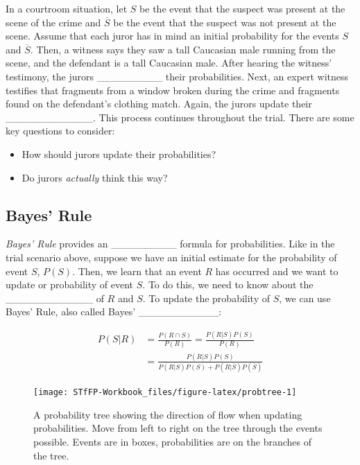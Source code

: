 \documentclass[]{book}
\providecommand{\tightlist}{%
  \setlength{\itemsep}{0pt}\setlength{\parskip}{0pt}}
\theoremstyle{definition}
\theoremstyle{definition}
\theoremstyle{remark}
\begin{document}
In a courtroom situation, let \(S\) be the event that the suspect was
present at the scene of the crime and \(\overline{S}\) be the event that
the suspect was not present at the scene. Assume that each juror has in
mind an initial probability for the events \(S\) and \(\overline{S}\).
Then, a witness says they saw a tall Caucasian male running from the
scene, and the defendant is a tall Caucasian male. After hearing the
witness' testimony, the jurors \_\_\_\_\_\_\_\_\_ their probabilities.
Next, an expert witness testifies that fragments from a window broken
during the crime and fragments found on the defendant's clothing match.
Again, the jurors update their \_\_\_\_\_\_\_\_\_\_\_\_. This process
continues throughout the trial. There are some key questions to
consider:

\begin{itemize}
\tightlist
\item
  How should jurors update their probabilities?
\item
  Do jurors \emph{actually} think this way?
\end{itemize}

\subsection{Bayes' Rule}\label{bayes-rule}

\emph{Bayes' Rule} provides an \_\_\_\_\_\_\_\_\_ formula for
probabilities. Like in the trial scenario above, suppose we have an
initial estimate for the probability of event \(S\), \(P(S)\). Then, we
learn that an event \(R\) has occurred and we want to update or
probability of event \(S\). To do this, we need to know about the
\_\_\_\_\_\_\_\_\_\_\_\_ of \(R\) and \(S\). To update the probability
of \(S\), we can use Bayes' Rule, also called Bayes'
\_\_\_\_\_\_\_\_\_\_\_:

\begin{equation}\label{eq:4}
\begin{split}
P(S|R) & = \frac{P(R \cap S)}{P(R)} = \frac{P(R|S)P(S)}{P(R)} \\
& = \frac{P(R|S)P(S)}{P(R|S)P(S) + P(R|\overline{S})P(\overline{S})} 
\end{split}
\end{equation}

\begin{figure}

{\centering \texttt{[image: STfFP-Workbook\_files/figure-latex/probtree-1]} 

}

\caption{A probability tree showing the direction of flow when updating probabilities. Move from left to right on the tree through the events possible. Events are in boxes, probabilities are on the branches of the tree.}\label{fig:probtree}
\end{figure}
\end{document}

